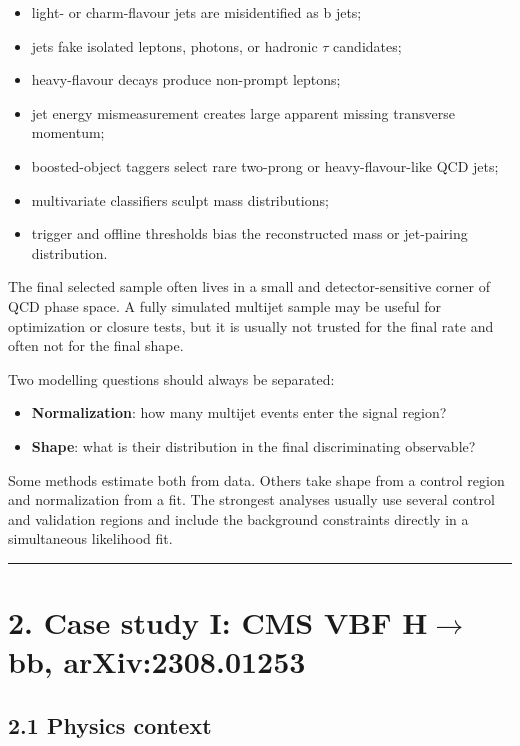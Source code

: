 \documentclass[11pt]{article}
\begin{document}
\begin{itemize}
\item light- or charm-flavour jets are misidentified as b jets;
\item jets fake isolated leptons, photons, or hadronic $\tau$ candidates;
\item heavy-flavour decays produce non-prompt leptons;
\item jet energy mismeasurement creates large apparent missing transverse momentum;
\item boosted-object taggers select rare two-prong or heavy-flavour-like QCD jets;
\item multivariate classifiers sculpt mass distributions;
\item trigger and offline thresholds bias the reconstructed mass or jet-pairing distribution.
\end{itemize}

The final selected sample often lives in a small and detector-sensitive corner of QCD phase space. A fully simulated multijet sample may be useful for optimization or closure tests, but it is usually not trusted for the final rate and often not for the final shape.

Two modelling questions should always be separated:

\begin{itemize}
\item \textbf{Normalization}: how many multijet events enter the signal region?
\item \textbf{Shape}: what is their distribution in the final discriminating observable?
\end{itemize}

Some methods estimate both from data. Others take shape from a control region and normalization from a fit. The strongest analyses usually use several control and validation regions and include the background constraints directly in a simultaneous likelihood fit.

\bigskip\hrule\bigskip

\section{2. Case study I: CMS VBF H$\to$bb, arXiv:2308.01253}

\subsection{2.1 Physics context}
\end{document}
